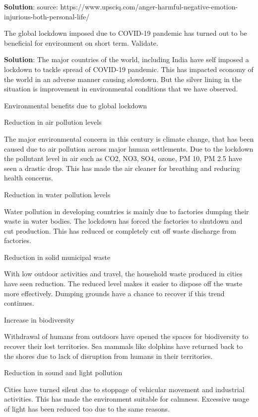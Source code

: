 \documentclass[
]{book}
\newcommand{\question}{\item}
\newenvironment{solution}{ {\bfseries Solution}:}{}
\begin{document}
\begin{questions}
\begin{solution}
source: https://www.upsciq.com/anger-harmful-negative-emotion-injurious-both-personal-life/
\end{solution}

\question The global lockdown imposed due to COVID-19 pandemic has turned out to be beneficial for environment on short term. Validate.

\begin{solution}
The major countries of the world, including India have self imposed a lockdown to tackle spread of COVID-19 pandemic. This has impacted economy of the world in an adverse manner causing slowdown. But the silver lining in the situation is improvement in environmental conditions that we have observed.

Environmental benefits due to global lockdown

Reduction in air pollution levels

The major environmental concern in this century is climate change, that has been caused due to air pollution across major human settlements. Due to the lockdown the pollutant level in air such as CO2, NO3, SO4, ozone, PM 10, PM 2.5 have seen a drastic drop. This has made the air cleaner for breathing and reducing health concerns.

Reduction in water pollution levels

Water pollution in developing countries is mainly due to factories dumping their waste in water bodies. The lockdown has forced the factories to shutdown and cut production. This has reduced or completely cut off waste discharge from factories.

Reduction in solid municipal waste

With low outdoor activities and travel, the household waste produced in cities have seen reduction. The reduced level makes it easier to dispose off the waste more effectively. Dumping grounds have a chance to recover if this trend continues.

Increase in biodiversity

Withdrawal of humans from outdoors have opened the spaces for biodiversity to recover their lost territories. Sea mammals like dolphins have returned back to the shores due to lack of disruption from humans in their territories.

Reduction in sound and light pollution

Cities have turned silent due to stoppage of vehicular movement and industrial activities. This has made the environment suitable for calmness. Excessive usage of light has been reduced too due to the same reasons.


\end{solution}
\end{questions}
\end{document}

